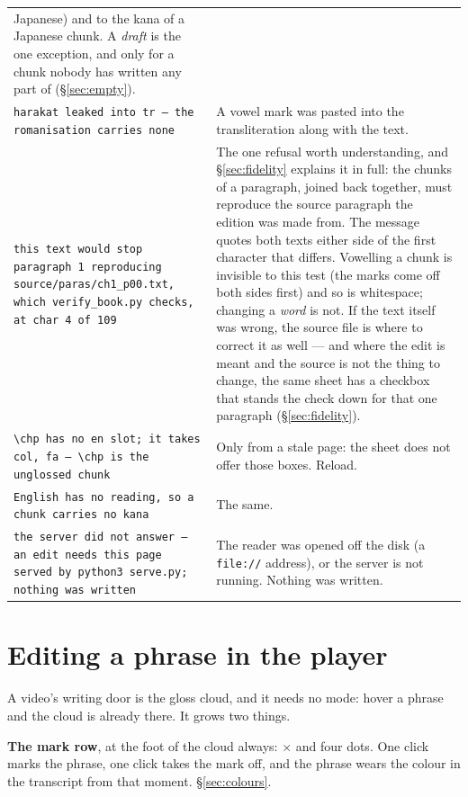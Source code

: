 \documentclass[11pt,oneside]{report}
\newcommand{\menu}[1]{\textsf{#1}}
\begin{document}
\begin{center}
\begin{longtable}{@{}p{}p{}@{}}
  Japanese) and to the kana of a Japanese chunk. A \emph{draft} is the one
  exception, and only for a chunk nobody has written any part of
  (\S\ref{sec:empty}). \\
\addlinespace
\texttt{harakat leaked into tr --- the romanisation carries none} &
  A vowel mark was pasted into the transliteration along with the text. \\
\addlinespace
\texttt{this text would stop paragraph 1 reproducing
source/paras/ch1\_p00.txt, which verify\_book.py checks, at char 4 of 109} &
  The one refusal worth understanding, and \S\ref{sec:fidelity} explains it
  in full: the chunks of a paragraph, joined back together, must
  reproduce the source paragraph the edition was made from. The message
  quotes both texts either side of the first character that differs. Vowelling
  a chunk is invisible to this test (the marks come off both sides first) and
  so is whitespace; changing a \emph{word} is not. If the text itself was
  wrong, the source file is where to correct it as well --- and where the
  edit is meant and the source is not the thing to change, the same sheet
  has a checkbox that stands the check down for that one paragraph
  (\S\ref{sec:fidelity}). \\
\addlinespace
\texttt{\textbackslash chp has no en slot; it takes col, fa ---
\textbackslash chp is the unglossed chunk} &
  Only from a stale page: the sheet does not offer those boxes. Reload. \\
\addlinespace
\texttt{English has no reading, so a chunk carries no kana} &
  The same. \\
\addlinespace
\texttt{the server did not answer --- an edit needs this page served by
python3 serve.py; nothing was written} &
  The reader was opened off the disk (a \texttt{file://} address), or the
  server is not running. Nothing was written. \\
\bottomrule
\end{longtable}
\end{center}

\section{Editing a phrase in the player}
\label{sec:editphrase}

A video's writing door is the gloss cloud, and it needs no mode: hover a
phrase and the cloud is already there. It grows two things.

\textbf{The mark row}, at the foot of the cloud always: \menu{$\times$} and
four dots. One click marks the phrase, one click takes the mark off, and the
phrase wears the colour in the transcript from that moment.
\S\ref{sec:colours}.
\end{document}

